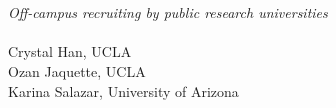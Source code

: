 \documentclass[twoside]{article}
\begin{document}
\begin{titlepage}

        \centering\color{DarkGray}\fontsize{30}{60}

        \vspace{0.3cm}
         \\

        \vspace{0.8cm}
        \textbf{\color{LogoRed}{RECRUITING}} \\
        \vspace{0.2cm}
        \textbf{\color{LogoRed}{THE OUT-OF-STATE UNIVERSITY}}

        \vspace{0.2cm}
        \Large\textit{\selectfont Off-campus recruiting by public research universities} \\

        \vspace{0.3cm}
         \\

	\vspace{17.1cm}
        \large Crystal Han, UCLA \\
        Ozan Jaquette, UCLA \\
        Karina Salazar, University of Arizona \\~\\

\end{titlepage}
\end{document}
